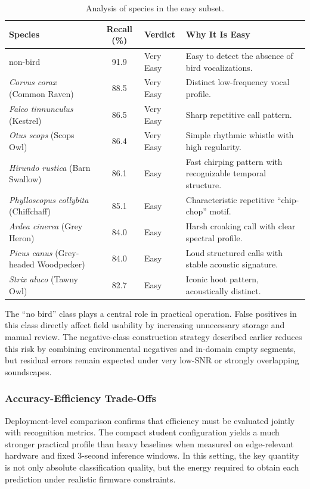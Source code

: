 \documentclass[a4paper,singleside,12pt]{report} %
\begin{document}
	\begin{table}[H]
		\centering
		\scriptsize
		\renewcommand{\arraystretch}{1.15}
		\setlength{\tabcolsep}{6pt}
		\caption{Analysis of species in the easy subset.}
		\label{tab:easy_species_analysis}
		\begin{tabular}{|p{3.3cm}|c|p{2.9cm}|p{6.2cm}|}
			\hline
			Species & Recall (\%) & Verdict & Why It Is Easy \\
			\hline
			non-bird & 91.9 & Very Easy & Easy to detect the absence of bird vocalizations. \\
			\hline
			\emph{Corvus corax} (Common Raven) & 88.5 & Very Easy & Distinct low-frequency vocal profile. \\
			\hline
			\emph{Falco tinnunculus} (Kestrel) & 86.5 & Very Easy & Sharp repetitive call pattern. \\
			\hline
			\emph{Otus scops} (Scops Owl) & 86.4 & Very Easy & Simple rhythmic whistle with high regularity. \\
			\hline
			\emph{Hirundo rustica} (Barn Swallow) & 86.1 & Easy & Fast chirping pattern with recognizable temporal structure. \\
			\hline
			\emph{Phylloscopus collybita} (Chiffchaff) & 85.1 & Easy & Characteristic repetitive ``chip-chop'' motif. \\
			\hline
			\emph{Ardea cinerea} (Grey Heron) & 84.0 & Easy & Harsh croaking call with clear spectral profile. \\
			\hline
			\emph{Picus canus} (Grey-headed Woodpecker) & 84.0 & Easy & Loud structured calls with stable acoustic signature. \\
			\hline
			\emph{Strix aluco} (Tawny Owl) & 82.7 & Easy & Iconic hoot pattern, acoustically distinct. \\
			\hline
		\end{tabular}
	\end{table}

	The ``no bird'' class plays a central role in practical operation. False positives in this class directly affect field usability by increasing unnecessary storage and manual review. The negative-class construction strategy described earlier reduces this risk by combining environmental negatives and in-domain empty segments, but residual errors remain expected under very low-SNR or strongly overlapping soundscapes.
	\subsubsection{Accuracy-Efficiency Trade-Offs}
	Deployment-level comparison confirms that efficiency must be evaluated jointly with recognition metrics. The compact student configuration yields a much stronger practical profile than heavy baselines when measured on edge-relevant hardware and fixed 3-second inference windows. In this setting, the key quantity is not only absolute classification quality, but the energy required to obtain each prediction under realistic firmware constraints.
\end{document}
